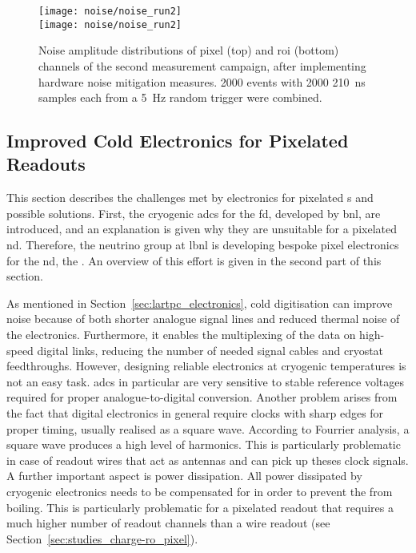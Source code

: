 \begin{figure}[htb]
	\centering
	\texttt{[image: noise/noise\_run2]} \\
	\texttt{[image: noise/noise\_run2]}
	\caption[Noise distributions from second pixel demonstrator measurement campaign]{%
		Noise amplitude distributions of pixel (top) and \acrshort{roi} (bottom) channels of the second measurement campaign, after implementing hardware noise mitigation measures.
		\num{2000} events with \num{2000} \SI{210}{\nano\second} samples each from a \SI{5}{\hertz} random trigger were combined.
	}
	\label{fig:electronics_noise-run2}
\end{figure}


\subsection{Improved Cold Electronics for Pixelated Readouts}
\label{sec:studies_electronics_pixel}


This section describes the challenges met by electronics for pixelated \lartpc{}s and possible solutions.
First, the cryogenic \glspl{adc} for the \dune{} \gls{fd}, developed by \gls{bnl}, are introduced, and an explanation is given why they are unsuitable for a pixelated \gls{nd}.
Therefore, the neutrino group at \gls{lbnl} is developing bespoke pixel electronics for the \gls{nd}, the \larpix{}.
An overview of this effort is given in the second part of this section.

As mentioned in Section~\ref{sec:lartpc_electronics}, cold digitisation can improve noise because of both shorter analogue signal lines and reduced thermal noise of the electronics.
Furthermore, it enables the multiplexing of the data on high-speed digital links, reducing the number of needed signal cables and cryostat feedthroughs.
However, designing reliable electronics at cryogenic temperatures is not an easy task.
\glspl{adc} in particular are very sensitive to stable reference voltages required for proper analogue-to-digital conversion.
Another problem arises from the fact that digital electronics in general require clocks with sharp edges for proper timing, usually realised as a square wave.
According to Fourrier analysis, a square wave produces a high level of harmonics.
This is particularly problematic in case of readout wires that act as antennas and can pick up theses clock signals.
A further important aspect is power dissipation.
All power dissipated by cryogenic electronics needs to be compensated for in order to prevent the \lar{} from boiling.
This is particularly problematic for a pixelated readout that requires a much higher number of readout channels than a wire readout (see Section~\ref{sec:studies_charge-ro_pixel}).

